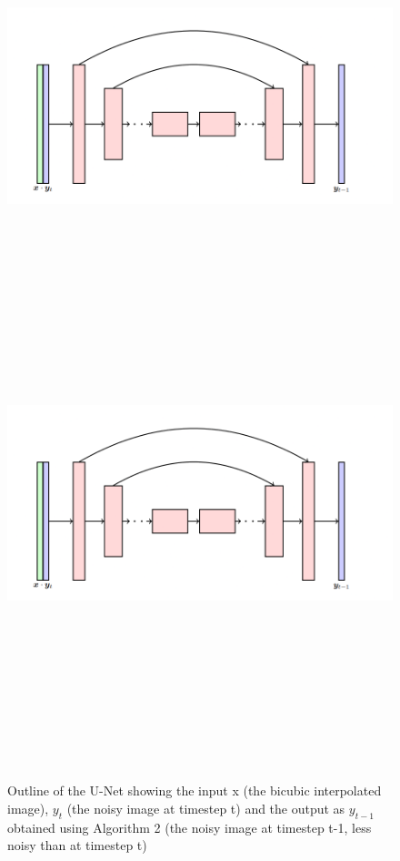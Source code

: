 \begin{figure}[!htbp]
  \begin{center}
    \leavevmode
    \ifpdf
      \includegraphics[height=3in]{Appendix1/images/sr3-new.png}
    \else
      \includegraphics[bb = 92 86 545 742, height=6in]{Appendix1/images/sr3-new.png}
    \fi
    \caption{ Outline of the U-Net showing the input x (the bicubic interpolated image), $y_t$ (the noisy image at timestep t) and the output as $y_{t-1}$ obtained using Algorithm 2 (the noisy image at timestep t-1, less noisy than at timestep t) \cite{saharia2021image}}
    \label{u_net_sr3}
  \end{center}
\end{figure}

